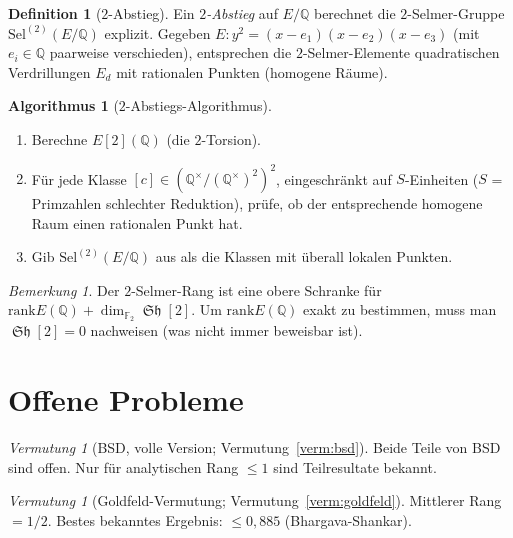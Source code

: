 \documentclass[12pt,a4paper]{amsart}
\theoremstyle{definition}
\newtheorem{definition_de}[theorem]{Definition}
\newtheorem{algorithmus}[theorem]{Algorithmus}
\theoremstyle{remark}
\newtheorem{bemerkung}[theorem]{Bemerkung}
\newtheorem{vermutung}[theorem]{Vermutung}
\newcommand{\Q}{\mathbb{Q}}
\newcommand{\F}{\mathbb{F}}
\newcommand{\Sel}{\mathrm{Sel}}
\DeclareMathOperator{\Sha}{\mathfrak{Sh}}
\newcommand{\rank}{\mathrm{rank}}
\begin{document}
\begin{definition_de}[$2$-Abstieg]
  Ein \emph{$2$-Abstieg} auf $E/\Q$ berechnet die $2$-Selmer-Gruppe
  $\Sel^{(2)}(E/\Q)$ explizit.
  Gegeben $E\colon y^2 = (x-e_1)(x-e_2)(x-e_3)$ (mit $e_i \in \Q$ paarweise
  verschieden), entsprechen die $2$-Selmer-Elemente quadratischen Verdrillungen
  $E_d$ mit rationalen Punkten (homogene Räume).
\end{definition_de}

\begin{algorithmus}[$2$-Abstiegs-Algorithmus]
  \begin{enumerate}[label=(\arabic*)]
    \item Berechne $E[2](\Q)$ (die $2$-Torsion).
    \item Für jede Klasse $[c] \in (\Q^\times / (\Q^\times)^2)^2$, eingeschränkt auf
      $S$-Einheiten ($S$ = Primzahlen schlechter Reduktion), prüfe, ob der entsprechende
      homogene Raum einen rationalen Punkt hat.
    \item Gib $\Sel^{(2)}(E/\Q)$ aus als die Klassen mit überall lokalen Punkten.
  \end{enumerate}
\end{algorithmus}

\begin{bemerkung}
  Der $2$-Selmer-Rang ist eine obere Schranke für $\rank E(\Q) + \dim_{\F_2} \Sha[2]$.
  Um $\rank E(\Q)$ exakt zu bestimmen, muss man $\Sha[2] = 0$ nachweisen
  (was nicht immer beweisbar ist).
\end{bemerkung}

\section{Offene Probleme}\label{sec:offene_probleme}

\begin{vermutung}[BSD, volle Version; Vermutung~\ref{verm:bsd}]
  Beide Teile von BSD sind offen.
  Nur für analytischen Rang $\leq 1$ sind Teilresultate bekannt.
\end{vermutung}

\begin{vermutung}[Goldfeld-Vermutung; Vermutung~\ref{verm:goldfeld}]
  Mittlerer Rang $= 1/2$.
  Bestes bekanntes Ergebnis: $\leq 0{,}885$ (Bhargava-Shankar).
\end{vermutung}
\end{document}

